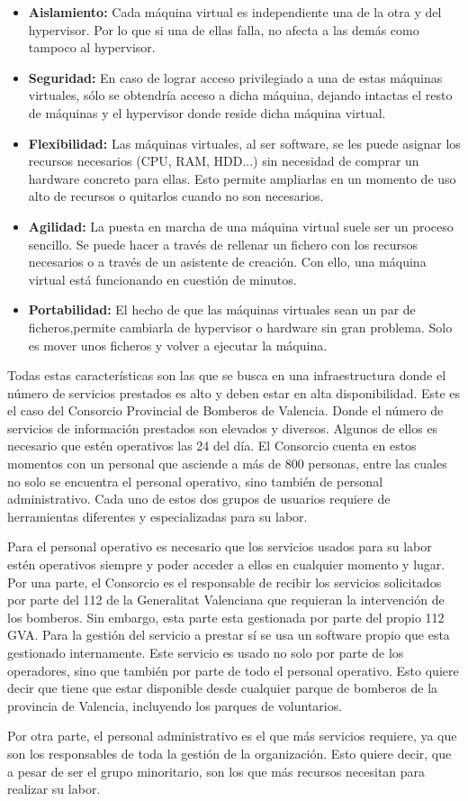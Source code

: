 \documentclass[12pt,a4paper,titlepage,twoside]{report}
\begin{document}
\begin{itemize}
\item \textbf{Aislamiento:} Cada máquina virtual es independiente una de la otra y del hypervisor. Por lo que si una de ellas falla, no afecta a las demás como tampoco al hypervisor.
\item \textbf{Seguridad:} En caso de lograr acceso privilegiado a una de estas máquinas virtuales, sólo se obtendría acceso a dicha máquina, dejando intactas el resto de máquinas y  el hypervisor donde reside dicha máquina virtual.
\item \textbf{Flexibilidad:} Las máquinas virtuales, al ser software, se les puede asignar los recursos necesarios (CPU, RAM, HDD...) sin necesidad de comprar un hardware concreto para ellas. Esto permite ampliarlas en un momento de uso alto de recursos o quitarlos cuando no son necesarios.
\item \textbf{Agilidad:} La puesta en marcha de una máquina virtual suele ser un proceso sencillo. Se puede hacer a través de rellenar un fichero con los recursos necesarios o a través de un asistente de creación. Con ello, una máquina virtual está funcionando en cuestión de minutos.
\item \textbf{Portabilidad:} El hecho de que las máquinas virtuales sean un par de ficheros,permite cambiarla de hypervisor o hardware sin gran problema. Solo es mover unos ficheros y volver a ejecutar la máquina.
\end{itemize}
\par 
Todas estas características son las que se busca en una infraestructura donde el número de servicios prestados es alto y deben estar en alta disponibilidad. Este es el caso del Consorcio Provincial de Bomberos de Valencia. Donde el número de servicios de información prestados son elevados y diversos. Algunos de ellos es necesario que estén operativos las 24 del día. 
El Consorcio cuenta en estos momentos con un personal que asciende a más de 800 personas, entre las cuales no solo se encuentra el personal operativo, sino también de personal administrativo. Cada uno de estos dos grupos de usuarios requiere de herramientas diferentes y especializadas para su labor. 
\par
Para el personal operativo es necesario que los servicios usados para su labor estén operativos siempre y poder acceder a ellos en cualquier momento y lugar. Por una parte, el Consorcio es el responsable de recibir los servicios solicitados por parte del 112 de la Generalitat Valenciana que requieran la intervención de los bomberos. Sin embargo, esta parte esta gestionada por parte del propio 112 GVA. Para la gestión del servicio a prestar sí se usa un software propio que esta gestionado internamente. Este servicio es usado no solo por parte de los operadores, sino que también por parte de todo el personal operativo. Esto quiere decir que tiene que estar disponible desde cualquier parque de bomberos de la provincia de Valencia, incluyendo los parques de voluntarios.
\par
Por otra parte, el personal administrativo es el que más servicios requiere, ya que son los responsables de toda la gestión de la organización. Esto quiere decir, que a pesar de ser el grupo minoritario, son los que más recursos necesitan para realizar su labor.
\end{document}
